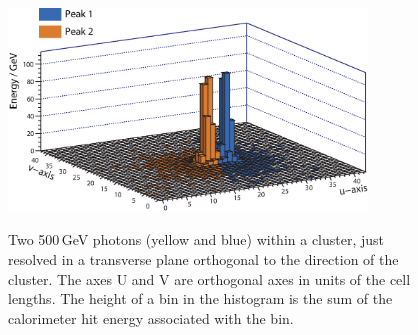 

\begin{figure}[tbph]
\centering
{\includegraphics[width=0.85\textwidth]{photon/peakFindingMod}}
\caption[Example of projecting a large photon cluster containing two photons.]
{Two 500\,GeV photons (yellow and blue) within a  cluster, just resolved in a transverse plane orthogonal to the direction of the cluster.  The axes U and V are orthogonal axes in units of the \ECAL cell lengths. The height of a bin in the histogram is the sum of the calorimeter hit energy associated with the bin.}
\label{fig:photonPeakFinding}
\end{figure}


